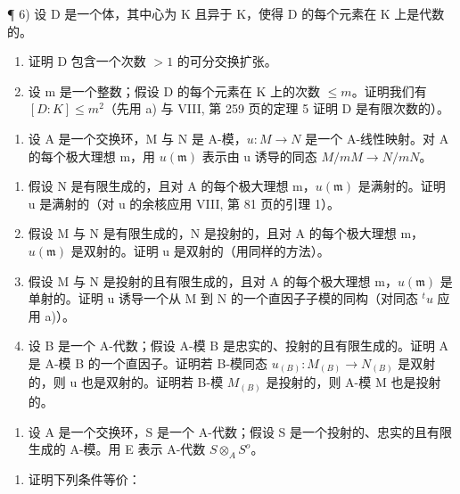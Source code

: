 ¶ 6) 设 D 是一个体，其中心为 K 且异于 K，使得 D 的每个元素在 K 上是代数的。

\begin{enumerate}
\def\labelenumi{\alph{enumi})}
\item
  证明 D 包含一个次数 \(>1\) 的可分交换扩张。
\item
  设 m 是一个整数；假设 D 的每个元素在 K 上的次数 \(\leqslant m\)。证明我们有 \([D:K]\leqslant m^{2}\)（先用 a) 与 VIII, 第 259 页的定理 5 证明 D 是有限次数的）。
\end{enumerate}

\begin{enumerate}
\def\labelenumi{\arabic{enumi})}
\setcounter{enumi}{6}
\tightlist
\item
  设 A 是一个交换环，M 与 N 是 A-模，\(u: M \to N\) 是一个 A-线性映射。对 A 的每个极大理想 m，用 \(u(\mathfrak{m})\) 表示由 u 诱导的同态 \(M/mM \to N/mN\)。
\end{enumerate}

\begin{enumerate}
\def\labelenumi{\alph{enumi})}
\item
  假设 N 是有限生成的，且对 A 的每个极大理想 m，\(u(\mathfrak{m})\) 是满射的。证明 u 是满射的（对 u 的余核应用 VIII, 第 81 页的引理 1）。
\item
  假设 M 与 N 是有限生成的，N 是投射的，且对 A 的每个极大理想 m，\(u(\mathfrak{m})\) 是双射的。证明 u 是双射的（用同样的方法）。
\item
  假设 M 与 N 是投射的且有限生成的，且对 A 的每个极大理想 m，\(u(\mathfrak{m})\) 是单射的。证明 u 诱导一个从 M 到 N 的一个直因子子模的同构（对同态 \(^{t}u\) 应用 a)）。
\item
  设 B 是一个 A-代数；假设 A-模 B 是忠实的、投射的且有限生成的。证明 A 是 A-模 B 的一个直因子。证明若 B-模同态 \(u_{(B)} : M_{(B)} \to N_{(B)}\) 是双射的，则 u 也是双射的。证明若 B-模 \(M_{(B)}\) 是投射的，则 A-模 M 也是投射的。
\end{enumerate}

\begin{enumerate}
\def\labelenumi{\arabic{enumi})}
\setcounter{enumi}{7}
\tightlist
\item
  设 A 是一个交换环，S 是一个 A-代数；假设 S 是一个投射的、忠实的且有限生成的 A-模。用 E 表示 A-代数 \(S \otimes_{A} S^{o}\)。
\end{enumerate}

\begin{enumerate}
\def\labelenumi{\alph{enumi})}
\tightlist
\item
  证明下列条件等价：
\end{enumerate}

